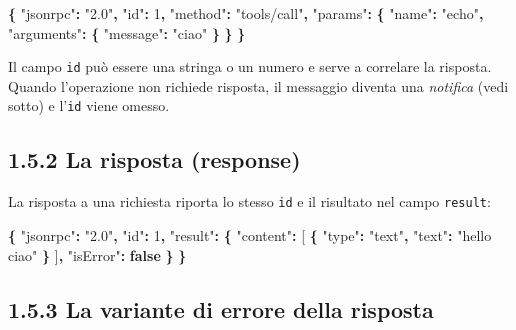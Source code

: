 \documentclass[
  italian,
  10pt,
]{book}
\newenvironment{Shaded}{\begin{snugshade}}{\end{snugshade}}
\newcommand{\DataTypeTok}[1]{\textcolor[rgb]{0.13,0.29,0.53}{#1}}
\newcommand{\DecValTok}[1]{\textcolor[rgb]{0.00,0.00,0.81}{#1}}
\newcommand{\FunctionTok}[1]{\textcolor[rgb]{0.13,0.29,0.53}{\textbf{#1}}}
\newcommand{\KeywordTok}[1]{\textcolor[rgb]{0.13,0.29,0.53}{\textbf{#1}}}
\newcommand{\OtherTok}[1]{\textcolor[rgb]{0.56,0.35,0.01}{#1}}
\newcommand{\StringTok}[1]{\textcolor[rgb]{0.31,0.60,0.02}{#1}}
\begin{document}
\begin{Shaded}
\begin{Highlighting}[]
\FunctionTok{\{}
  \DataTypeTok{"jsonrpc"}\FunctionTok{:} \StringTok{"2.0"}\FunctionTok{,}
  \DataTypeTok{"id"}\FunctionTok{:} \DecValTok{1}\FunctionTok{,}
  \DataTypeTok{"method"}\FunctionTok{:} \StringTok{"tools/call"}\FunctionTok{,}
  \DataTypeTok{"params"}\FunctionTok{:} \FunctionTok{\{}
    \DataTypeTok{"name"}\FunctionTok{:} \StringTok{"echo"}\FunctionTok{,}
    \DataTypeTok{"arguments"}\FunctionTok{:} \FunctionTok{\{} \DataTypeTok{"message"}\FunctionTok{:} \StringTok{"ciao"} \FunctionTok{\}}
  \FunctionTok{\}}
\FunctionTok{\}}
\end{Highlighting}
\end{Shaded}

Il campo \texttt{id} può essere una stringa o un numero e serve a
correlare la risposta. Quando l'operazione non richiede risposta, il
messaggio diventa una \emph{notifica} (vedi sotto) e l'\texttt{id} viene
omesso.

\subsection{1.5.2 La risposta (response)}\label{la-risposta-response}

La risposta a una richiesta riporta lo stesso \texttt{id} e il risultato
nel campo \texttt{result}:

\begin{Shaded}
\begin{Highlighting}[]
\FunctionTok{\{}
  \DataTypeTok{"jsonrpc"}\FunctionTok{:} \StringTok{"2.0"}\FunctionTok{,}
  \DataTypeTok{"id"}\FunctionTok{:} \DecValTok{1}\FunctionTok{,}
  \DataTypeTok{"result"}\FunctionTok{:} \FunctionTok{\{}
    \DataTypeTok{"content"}\FunctionTok{:} \OtherTok{[}
      \FunctionTok{\{} \DataTypeTok{"type"}\FunctionTok{:} \StringTok{"text"}\FunctionTok{,} \DataTypeTok{"text"}\FunctionTok{:} \StringTok{"hello ciao"} \FunctionTok{\}}
    \OtherTok{]}\FunctionTok{,}
    \DataTypeTok{"isError"}\FunctionTok{:} \KeywordTok{false}
  \FunctionTok{\}}
\FunctionTok{\}}
\end{Highlighting}
\end{Shaded}

\subsection{1.5.3 La variante di errore della
risposta}\label{la-variante-di-errore-della-risposta}
\end{document}
